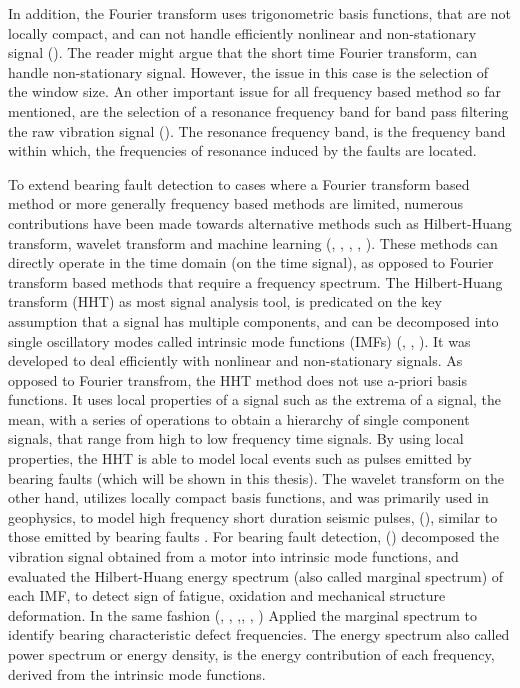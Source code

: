 \documentclass[../Main/thesis.tex]{subfiles}
\begin{document}
 \justify
  In addition, the Fourier transform uses trigonometric basis functions, that are not locally compact, and can not handle efficiently nonlinear and non-stationary signal (\cite{huang98}). The reader might argue that the short time Fourier transform, can handle non-stationary signal. However, the issue in this case is the selection of the window size. An other important issue for all frequency based method so far mentioned, are the selection of a resonance frequency band for band pass filtering the raw vibration signal (\cite{zhao2014}). The resonance frequency band, is the frequency band within which, the frequencies of resonance induced by the faults are located.
 \justify
 
 
\justify
 To extend bearing fault detection to cases where a Fourier transform based method or more generally frequency based methods are limited,
numerous contributions have been made towards alternative methods such as Hilbert-Huang transform, wavelet transform and machine learning (\cite{zhang2019}, \cite{xiaoan2018}, \cite{rai2016}, \cite{konar2011}, \cite{rai2006} ). These methods can directly operate in the time domain (on the time signal), as opposed to Fourier transform based methods that require a frequency spectrum. 
\justify
The Hilbert-Huang transform (HHT) as most signal analysis tool, is predicated on the key assumption that a signal has multiple components, and can be decomposed into single oscillatory modes called intrinsic mode functions (IMFs) (\cite{fosso2019}, \cite{huang08}, \cite{huang98}). It was developed to deal efficiently with nonlinear and non-stationary signals. As opposed to Fourier transfrom, the HHT method does not use a-priori basis functions. It uses local properties of a signal such as the extrema of a signal, the mean, with a series of operations to obtain a hierarchy of single component signals, that range from high to low frequency time signals. By using local properties, the HHT is able to model local events such as pulses emitted by bearing faults (which will be shown in this thesis). The wavelet transform on the other hand, utilizes locally compact basis functions, and was primarily used in geophysics, to model high frequency short duration seismic pulses, (\cite{albert09}), similar to those emitted by bearing faults .
\justify
For bearing fault detection, (\cite{fan2016}) decomposed the vibration signal obtained from a motor into intrinsic mode functions, and evaluated the Hilbert-Huang energy spectrum (also called marginal spectrum) of each IMF, to detect sign of fatigue, oxidation and mechanical structure deformation. In the same fashion (\cite{peng2004}, \cite{soualhi2015}, \cite{osman2014},\cite{osman2013a}, \cite{osman2013b}, \cite{li2008}) Applied the marginal spectrum to identify bearing characteristic defect frequencies. The energy spectrum also called power spectrum or energy density, is the energy contribution of each frequency, derived from the intrinsic mode functions.
\end{document}
